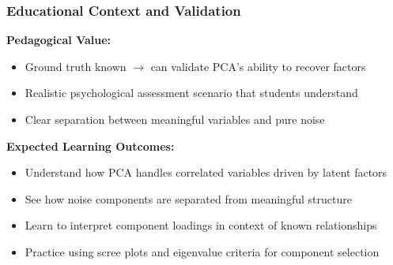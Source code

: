 \documentclass[aspectratio=169]{beamer}
\begin{document}
\begin{frame}
    \frametitle{Educational Context and Validation}
    \textbf{Pedagogical Value:}
    \begin{itemize}
        \item Ground truth known $\rightarrow$ can validate PCA's ability to recover factors \pause
        \item Realistic psychological assessment scenario that students understand \pause
        \item Clear separation between meaningful variables and pure noise \pause
    \end{itemize}
    \vspace{12pt}
    \textbf{Expected Learning Outcomes:}
    \begin{itemize}
        \item Understand how PCA handles correlated variables driven by latent factors \pause
        \item See how noise components are separated from meaningful structure \pause
        \item Learn to interpret component loadings in context of known relationships \pause
        \item Practice using scree plots and eigenvalue criteria for component selection \pause
    \end{itemize}
\end{frame}
\end{document}
